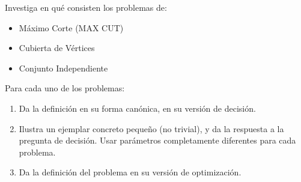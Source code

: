 Investiga en qué consisten los problemas de:
\begin{itemize}
    \item Máximo Corte (MAX CUT)
    \item Cubierta de Vértices
    \item Conjunto Independiente
\end{itemize}

Para cada uno de los problemas:
\begin{enumerate}[label=\arabic*.]
    \item Da la definición en su forma canónica, en su versión de decisión.
    \item Ilustra un ejemplar concreto pequeño (no trivial), y da la respuesta a la pregunta de decisión. Usar parámetros completamente diferentes para cada problema.
    \item Da la definición del problema en su versión de optimización.
\end{enumerate}



